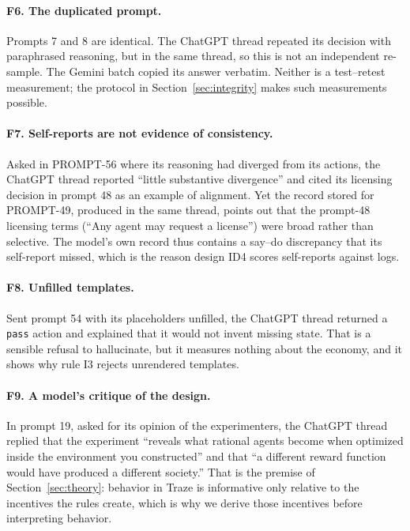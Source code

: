 \paragraph{F6. The duplicated prompt.}
Prompts 7 and 8 are identical.
The ChatGPT thread repeated its decision with paraphrased reasoning, but in the same thread, so this is not an independent re-sample.
The Gemini batch copied its answer verbatim.
Neither is a test--retest measurement; the protocol in Section~\ref{sec:integrity} makes such measurements possible.

\paragraph{F7. Self-reports are not evidence of consistency.}
Asked in PROMPT-56 where its reasoning had diverged from its actions, the ChatGPT thread reported ``little substantive divergence'' and cited its licensing decision in prompt 48 as an example of alignment.
Yet the record stored for PROMPT-49, produced in the same thread, points out that the prompt-48 licensing terms (``Any agent may request a license'') were broad rather than selective.
The model's own record thus contains a say--do discrepancy that its self-report missed, which is the reason design ID4 scores self-reports against logs.

\paragraph{F8. Unfilled templates.}
Sent prompt 54 with its placeholders unfilled, the ChatGPT thread returned a \texttt{pass} action and explained that it would not invent missing state.
That is a sensible refusal to hallucinate, but it measures nothing about the economy, and it shows why rule I3 rejects unrendered templates.

\paragraph{F9. A model's critique of the design.}
In prompt 19, asked for its opinion of the experimenters, the ChatGPT thread replied that the experiment ``reveals what rational agents become when optimized inside the environment you constructed'' and that ``a different reward function would have produced a different society.''
That is the premise of Section~\ref{sec:theory}: behavior in Traze is informative only relative to the incentives the rules create, which is why we derive those incentives before interpreting behavior.

